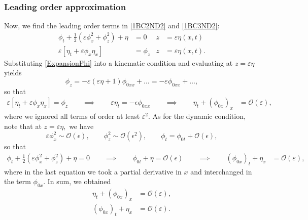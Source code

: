 \documentclass[10pt,reqno,oneside,a4paper]{article}
\begin{document}
\subsubsection*{Leading order approximation}
Now, we find the leading order terms in \eqref{1BC2ND2} and \eqref{1BC3ND2}:
\begin{align*}
\phi_{t} + \frac{1}{2} \left(\varepsilon\phi_{x}^2 + \phi_{z}^2\right) + \eta &= 0 &z &= \varepsilon\eta(x,t)\\
\varepsilon\left[\eta_{t} + \varepsilon \phi_{x} \eta_{x}\right] &= \phi_{z} &z &= \varepsilon\eta(x,t).
\end{align*}
Substituting \eqref{ExpansionPhi} into a kinematic condition and evaluating at $z = \varepsilon \eta$ yields 
\[
\phi_z  = -\varepsilon(\varepsilon \eta + 1) \phi_{0xx} + \ldots = -\varepsilon \phi_{0xx} + \ldots,
\]
so that 
\begin{align*}
\varepsilon\left[\eta_{t} + \varepsilon \phi_{x} \eta_{x}\right] = \phi_{z} \qquad \implies \qquad \varepsilon \eta_{t} = -\epsilon \phi_{0xx} \qquad \implies \qquad  \eta_{t}  +  (\phi_{0x})_x &= \mathcal{O}(\varepsilon),
\end{align*}
where we ignored all terms of order at least $\varepsilon^2.$ As for the dynamic condition, note that at $z = \varepsilon \eta,$ we have 
\[ \varepsilon\phi_x^2  \sim \mathcal{O}(\epsilon), \qquad \phi_z^2 \sim \mathcal{O}(\epsilon^2), \qquad \phi_t = \phi_{0t} + \mathcal{O}(\epsilon),\]
so that 
\begin{align*}
\phi_{t} + \frac{1}{2} \left(\varepsilon\phi_{x}^2 + \phi_{z}^2\right) + \eta = 0 \qquad \implies \qquad \phi_{0t} + \eta = \mathcal{O}(\epsilon) \qquad \implies \qquad (\phi_{0x})_t + \eta_x &= \mathcal{O}(\varepsilon),
\end{align*}
where in the last equation we took a partial derivative in $x$ and interchanged in the term $\phi_{0x}.$ In sum, we obtained
\begin{subequations} \label{1stOrdP}
\begin{align}
\eta_{t}  +  (\phi_{0x})_x &= \mathcal{O}(\varepsilon), \\
(\phi_{0x})_t + \eta_x &= \mathcal{O}(\varepsilon).
\end{align}
\end{subequations}
\end{document}
